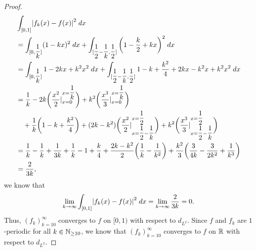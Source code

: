 \begin{proof}
\begin{align*}
     & \int_{[0, 1]} \abs{f_k(x) - f(x)}^2 \; dx                                                                                                                                                                                                    \\
     & = \int_{[0, \dfrac{1}{k}]} (1 - kx)^2 \; dx + \int_{[\dfrac{1}{2} - \dfrac{1}{k}, \dfrac{1}{2}]} \bigg(1 - \dfrac{k}{2} + kx\bigg)^2 \; dx                                                                                                   \\
     & = \int_{[0, \dfrac{1}{k}]} 1 - 2kx + k^2 x^2 \; dx + \int_{[\dfrac{1}{2} - \dfrac{1}{k}, \dfrac{1}{2}]} 1 - k + \dfrac{k^2}{4} + 2kx - k^2 x + k^2 x^2 \; dx                                                                                 \\
     & = \dfrac{1}{k} - 2k \bigg(\dfrac{x^2}{2}|_{x = 0}^{x = \dfrac{1}{k}}\bigg) + k^2 \bigg(\dfrac{x^3}{3}|_{x = 0}^{x = \dfrac{1}{k}}\bigg)                                                                                                      \\
     & \quad + \dfrac{1}{k} \bigg(1 - k + \dfrac{k^2}{4}\bigg) + (2k - k^2) \bigg(\dfrac{x^2}{2}|_{x = \dfrac{1}{2} - \dfrac{1}{k}}^{x = \dfrac{1}{2}}\bigg) + k^2 \bigg(\dfrac{x^3}{3}|_{x = \dfrac{1}{2} - \dfrac{1}{k}}^{x = \dfrac{1}{2}}\bigg) \\
     & = \dfrac{1}{k} - \dfrac{1}{k} + \dfrac{1}{3k} + \dfrac{1}{k} - 1 + \dfrac{k}{4} + \dfrac{2k - k^2}{2} \bigg(\dfrac{1}{k} - \dfrac{1}{k^2}\bigg) + \dfrac{k^2}{3} \bigg(\dfrac{3}{4k} - \dfrac{3}{2k^2} + \dfrac{1}{k^3}\bigg)                \\
     & = \dfrac{2}{3k},
  \end{align*}
  we know that
  \[
    \lim_{k \to \infty} \int_{[0, 1]} \abs{f_k(x) - f(x)}^2 \; dx = \lim_{k \to \infty} \dfrac{2}{3k} = 0.
  \]
  Thus, \((f_k)_{k = 10}^\infty\) converges to \(f\) on \([0, 1)\) with respect to \(d_{L^2}\).
  Since \(f\) and \(f_k\) are \(1\)-periodic for all \(k \in \mathbb{N}_{\geq 10}\), we know that \((f_k)_{k = 10}^\infty\) converges to \(f\) on \(\mathbb{R}\) with respect to \(d_{L^2}\).
\end{proof}

